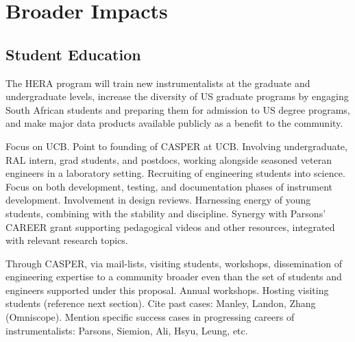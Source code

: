 \documentclass[preprint]{aastex}
\begin{document}

\section{Broader Impacts} %



\subsection{Student Education}

The HERA program will train new instrumentalists at the graduate and undergraduate levels, increase the
diversity of US graduate programs by engaging South African students and preparing them for admission to US degree programs, and make major data products available publicly as a benefit to the community.

Focus on UCB. 
Point to founding of CASPER at UCB.
Involving undergraduate, RAL intern, grad students, and postdocs, working alongside seasoned veteran engineers in a laboratory setting.
Recruiting of engineering students into science.
Focus on both development, testing, and documentation phases of instrument development.  
Involvement in design reviews.
Harnessing energy of young students, combining with the stability and discipline.
Synergy with Parsons' CAREER grant supporting pedagogical videos and other resources, integrated with relevant
research topics.

Through CASPER, via mail-lists, visiting students, workshops, dissemination of engineering expertise to a community broader
even than the set of students and engineers supported under this proposal.
Annual workshops.
Hosting visiting students (reference next section). Cite past cases: Manley, Landon, Zhang (Omniscope).
Mention specific success cases in progressing careers of instrumentalists: Parsons, Siemion, Ali, Hsyu, Leung, etc.
\end{document}
